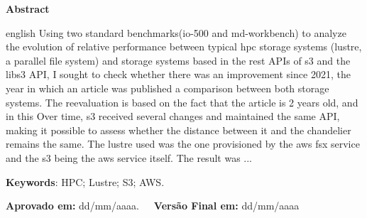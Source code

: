 \documentclass[article,a4paper,12pt,brazil,sumario=tradicional]{abntex2}
\begin{document}
\begin{center}
    \textbf{Abstract}
\end{center}

\vspace{-.3cm}
\begin{hyphenrules}{english}
\noindent Using two standard benchmarks(io-500 and md-workbench) to analyze the evolution of relative performance between
typical hpc storage systems (lustre, a parallel file system) and storage systems based
in the rest APIs of s3 and the libs3 API, I sought to check whether there was an improvement since 2021, the year in which an article was published
a comparison between both storage systems. The reevaluation is based on the fact that the article is 2 years old, and in this
Over time, s3 received several changes and maintained the same API, making it possible to assess whether the distance between it and the chandelier
remains the same. The lustre used was the one provisioned by the aws fsx service and the s3 being the aws service itself. The result was ...
\end{hyphenrules}
\vspace{.4cm}
 
\noindent \textbf{Keywords}: HPC; Lustre; S3; AWS.

\vspace{.4cm}

\noindent \textbf{Aprovado em:} dd/mm/aaaa.~~~\textbf{Versão Final em:} dd/mm/aaaa
\end{document}
